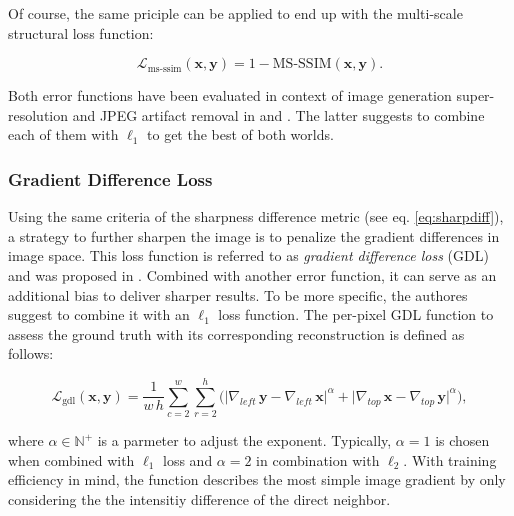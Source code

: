 Of course, the same priciple can be applied to end up with the multi-scale structural loss function:

\begin{equation} \label{eq:sharpdiff}
\mathcal{L}_{\textrm{ms-ssim}}(\textbf{x}, \textbf{y}) = 1 - \textrm{MS-SSIM}(\textbf{x}, \textbf{y}).
\end{equation}

Both error functions have been evaluated in context of image generation super-resolution and JPEG artifact removal in \parencite{learning-perc-sim} and \parencite{loss-func-img-proc}. The latter suggests to combine each of them with $ \ell_1 $ to get the best of both worlds.

\subsubsection*{Gradient Difference Loss}

Using the same criteria of the sharpness difference metric (see eq. \ref{eq:sharpdiff}), a strategy to further sharpen the image is to penalize the gradient differences in image space. This loss function is referred to as \textit{gradient difference loss} (GDL) and was proposed in \parencite{deep_multiscale_video_pred}. Combined with another error function, it can serve as an additional bias to deliver sharper results. To be more specific, the authores suggest to combine it with an $ \ell_1 $ loss function. The per-pixel GDL function to assess the ground truth with its corresponding reconstruction is defined as follows:

\begin{equation} \label{eq:sharpdiff}
\mathcal{L}_{\textrm{gdl}}(\textbf{x}, \textbf{y}) = \frac{1}{w \, h} \sum_{c=2}^{w} \sum_{r=2}^{h} \Big(\big|\nabla_{left} \, \textbf{y} - \nabla_{left} \, \textbf{x}\big|^{\alpha} + \big|\nabla_{top} \, \textbf{x} - \nabla_{top} \, \textbf{y}\big|^{\alpha}\Big) ,
\end{equation}

where $ \alpha \in \mathbb{N}^{+} $ is a parmeter to adjust the exponent. Typically, $ \alpha = 1 $ is chosen when combined with $ \ell_1 $ loss and $ \alpha = 2 $ in combination with $ \ell_2 $. With training efficiency in mind, the function describes the most simple image gradient by only considering the the intensitiy difference of the direct neighbor.